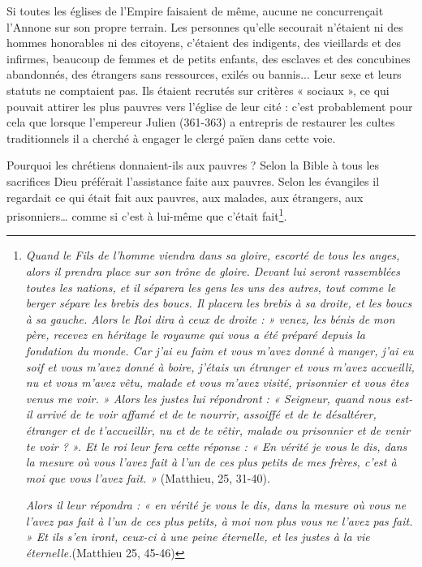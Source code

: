  Si toutes les églises de l'Empire faisaient de même, aucune ne concurrençait l'Annone sur son propre terrain. Les personnes qu'elle secourait n'étaient ni des hommes honorables ni des citoyens, c'étaient des indigents, des vieillards et des infirmes, beaucoup de femmes et de petits enfants, des esclaves et des concubines abandonnés, des étrangers sans ressources, exilés ou bannis... Leur sexe et leurs statuts ne comptaient pas. Ils étaient recrutés sur critères « sociaux », ce qui pouvait attirer les plus pauvres vers l'église de leur cité : c'est probablement pour cela que lorsque l'empereur Julien (361-363) a entrepris de restaurer les cultes traditionnels il a cherché à engager le clergé païen dans cette voie.

 Pourquoi les chrétiens donnaient-ils aux pauvres ? Selon la Bible à tous les sacrifices Dieu préférait  l'assistance faite aux pauvres. Selon les évangiles il regardait ce qui était fait aux pauvres, aux malades, aux étrangers, aux prisonniers… comme si c'est à lui-même que c'était fait\footnote{\emph{Quand le Fils de l'homme viendra dans sa gloire, escorté de tous les anges, alors il prendra place sur son trône de gloire. Devant lui seront rassemblées toutes les nations, et il séparera les gens les uns des autres, tout comme le berger sépare les brebis des boucs. Il placera les brebis à sa droite, et les boucs à sa gauche. Alors le Roi dira à ceux de droite : » venez, les bénis de mon père, recevez en héritage le royaume qui vous a été préparé depuis la fondation du monde. Car j'ai eu faim et vous m'avez donné à manger, j'ai eu soif et vous m'avez donné à boire, j'étais un étranger et vous m'avez accueilli, nu et vous m'avez vêtu, malade et vous m'avez visité, prisonnier et vous êtes venus me voir. » Alors les justes lui répondront : « Seigneur, quand nous est-il arrivé de te voir affamé et de te nourrir, assoiffé et de te désaltérer, étranger et de t'accueillir, nu et de te vêtir, malade ou prisonnier et de venir te voir ? ». Et le roi leur fera cette réponse : « En vérité je vous le dis, dans la mesure où vous l'avez fait à l'un de ces plus petits de mes frères, c'est à moi que vous l'avez fait. »} (Matthieu, 25, 31-40).
 
  \emph{Alors il leur répondra : « en vérité je vous le dis, dans la mesure où vous ne l'avez pas fait à l'un de ces plus petits, à moi non plus vous ne l'avez pas fait. » Et ils s'en iront, ceux-ci à une peine éternelle, et les justes à la vie éternelle.}(Matthieu 25, 45-46)}.




